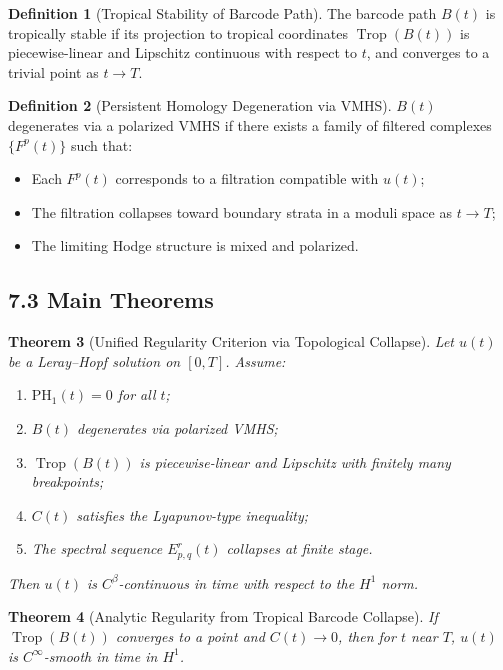 \documentclass[11pt]{article}
\newtheorem{theorem}{Theorem}[section]
\theoremstyle{definition}
\newtheorem{definition}[theorem]{Definition}
\begin{document}
\begin{definition}[Tropical Stability of Barcode Path]
The barcode path $B(t)$ is tropically stable if its projection to tropical coordinates $\operatorname{Trop}(B(t))$ is piecewise-linear and Lipschitz continuous with respect to $t$, and converges to a trivial point as $t \to T$.
\end{definition}

\begin{definition}[Persistent Homology Degeneration via VMHS]
$B(t)$ degenerates via a polarized VMHS if there exists a family of filtered complexes $\{F^p(t)\}$ such that:
\begin{itemize}
  \item Each $F^p(t)$ corresponds to a filtration compatible with $u(t)$;
  \item The filtration collapses toward boundary strata in a moduli space as $t \to T$;
  \item The limiting Hodge structure is mixed and polarized.
\end{itemize}
\end{definition}

\subsection*{7.3 Main Theorems}

\begin{theorem}[Unified Regularity Criterion via Topological Collapse]
Let $u(t)$ be a Leray--Hopf solution on $[0,T]$. Assume:
\begin{enumerate}
  \item $\mathrm{PH}_1(t) = 0$ for all $t$;
  \item $B(t)$ degenerates via polarized VMHS;
  \item $\operatorname{Trop}(B(t))$ is piecewise-linear and Lipschitz with finitely many breakpoints;
  \item $C(t)$ satisfies the Lyapunov-type inequality;
  \item The spectral sequence $E^r_{p,q}(t)$ collapses at finite stage.
\end{enumerate}
Then $u(t)$ is $C^\beta$-continuous in time with respect to the $H^1$ norm.
\end{theorem}

\begin{theorem}[Analytic Regularity from Tropical Barcode Collapse]
If $\operatorname{Trop}(B(t))$ converges to a point and $C(t) \to 0$, then for $t$ near $T$, $u(t)$ is $C^\infty$-smooth in time in $H^1$.
\end{theorem}
\end{document}
